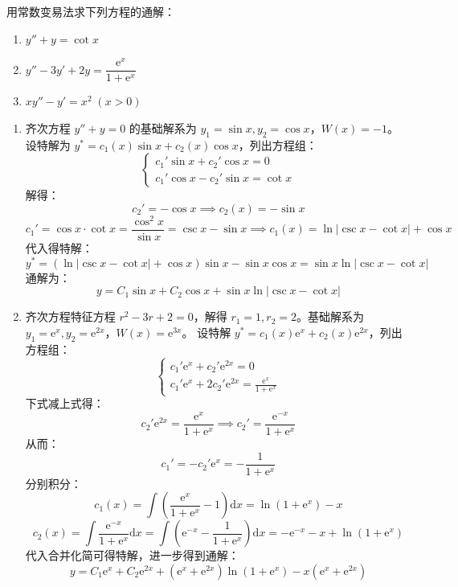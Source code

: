 \documentclass[lang=cn,11pt]{elegantbook}
\begin{document}
\begin{exercise}[基础：常数变易法]
用常数变易法求下列方程的通解：
\begin{enumerate}
  \item[(1)] $y''+y=\cot x$
  \item[(2)] $y''-3y'+2y=\dfrac{\mathrm{e}^x}{1+\mathrm{e}^x}$
  \item[(3)] $xy''-y'=x^2\;(x>0)$
\end{enumerate}
\end{exercise}
\begin{solution}
\begin{enumerate}
  \item[(1)] 齐次方程 $y''+y=0$ 的基础解系为 $y_1 = \sin x, y_2 = \cos x$，$W(x) = -1$。
  设特解为 $y^* = c_1(x)\sin x + c_2(x)\cos x$，列出方程组：
  \[
  \begin{cases}
  c_1' \sin x + c_2' \cos x = 0 \\
  c_1' \cos x - c_2' \sin x = \cot x
  \end{cases}
  \]
  解得：
  \[
  c_2' = -\cos x \implies c_2(x) = -\sin x
  \]
  \[
  c_1' = \cos x \cdot \cot x = \frac{\cos^2 x}{\sin x} = \csc x - \sin x \implies c_1(x) = \ln|\csc x - \cot x| + \cos x
  \]
  代入得特解：
  \[
  y^* = (\ln|\csc x - \cot x| + \cos x)\sin x - \sin x \cos x = \sin x \ln|\csc x - \cot x|
  \]
  通解为：
  \[
  y = C_1 \sin x + C_2 \cos x + \sin x \ln|\csc x - \cot x|
  \]
  \item[(2)] 齐次方程特征方程 $r^2 - 3r + 2 = 0$，解得 $r_1=1, r_2=2$。基础解系为 $y_1=\mathrm{e}^x, y_2=\mathrm{e}^{2x}$，$W(x) = \mathrm{e}^{3x}$。
  设特解 $y^* = c_1(x)\mathrm{e}^x + c_2(x)\mathrm{e}^{2x}$，列出方程组：
  \[
  \begin{cases}
  c_1' \mathrm{e}^x + c_2' \mathrm{e}^{2x} = 0 \\
  c_1' \mathrm{e}^x + 2c_2' \mathrm{e}^{2x} = \frac{\mathrm{e}^x}{1+\mathrm{e}^x}
  \end{cases}
  \]
  下式减上式得：
  \[
  c_2' \mathrm{e}^{2x} = \frac{\mathrm{e}^x}{1+\mathrm{e}^x} \implies c_2' = \frac{\mathrm{e}^{-x}}{1+\mathrm{e}^x}
  \]
  从而：
  \[
  c_1' = -c_2' \mathrm{e}^x = -\frac{1}{1+\mathrm{e}^x}
  \]
  分别积分：
  \[
  c_1(x) = \int \left(\frac{\mathrm{e}^x}{1+\mathrm{e}^x} - 1\right) \mathrm{d}x = \ln(1+\mathrm{e}^x) - x
  \]
  \[
  c_2(x) = \int \frac{\mathrm{e}^{-x}}{1+\mathrm{e}^x} \mathrm{d}x = \int \left(\mathrm{e}^{-x} - \frac{1}{1+\mathrm{e}^x}\right) \mathrm{d}x = -\mathrm{e}^{-x} - x + \ln(1+\mathrm{e}^x)
  \]
  代入合并化简可得特解，进一步得到通解：
  \[
  y = C_1\mathrm{e}^x + C_2\mathrm{e}^{2x} + (\mathrm{e}^x + \mathrm{e}^{2x})\ln(1+\mathrm{e}^x) - x(\mathrm{e}^x + \mathrm{e}^{2x})
\]
\end{enumerate}
\end{solution}
\end{document}
